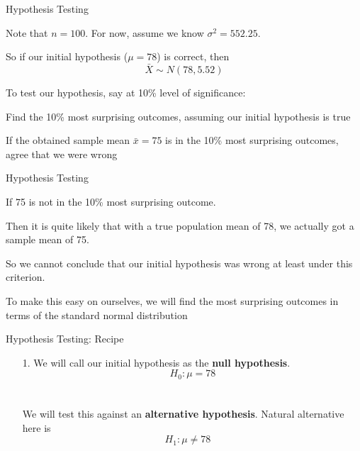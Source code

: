 \documentclass{./../div_teaching_slides}
\begin{document}
\begin{frame}{Hypothesis Testing}
\vspace{-0.5em}
\begin{witemize}
  \item Note that $n=100$. For now, assume we know $\sigma^2 = 552.25$. 
  \item So if our initial hypothesis ($\mu=78$) is correct, then $$\bar{X} \sim N(78, 5.52)$$
  \item To test our hypothesis, say at 10\% level of significance: \\ \vspace{0.1em}
  \begin{witemize}
  \normalsize
  \item Find the 10\% most surprising outcomes, assuming our initial hypothesis is true
  \item If the obtained sample mean $\bar{x}=75$ is in the 10\% most surprising outcomes, agree that we were wrong 
\end{witemize}
\end{witemize}
\end{frame}

\begin{frame}{Hypothesis Testing}
\begin{witemize}
  \item If 75 is not in the 10\% most surprising outcome.
  \item Then it is quite likely that with a true population mean of 78, we actually got a sample mean of 75.
  \item So we cannot conclude that our initial hypothesis was wrong at least under this criterion.
  \item To make this easy on ourselves, we will find the most surprising outcomes in terms of the standard normal distribution
\end{witemize}
\end{frame}

\begin{frame}{Hypothesis Testing: Recipe}
\begin{enumerate}
\item[1.] We will call our initial hypothesis as the \textbf{null hypothesis}. 
$$ H_0: \mu = 78 $$ \\~\\
We will test this against an \textbf{alternative hypothesis}. Natural alternative here is
$$ H_1: \mu \neq 78 \quad $$ 
\end{enumerate}
\end{frame}
\end{document}

